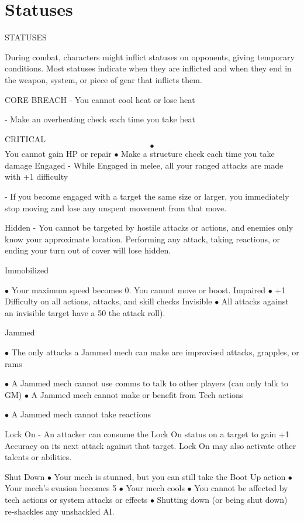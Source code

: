 \chapter{Statuses}

  STATUSES

During combat, characters might inflict statuses on opponents, giving temporary conditions. Most
statuses indicate when they are inflicted and when they end in the weapon, system, or piece of
gear that inflicts them.

CORE BREACH
    -   You cannot cool heat or lose heat

    -   Make an overheating check each time you take heat

CRITICAL
    $$\bullet$$   You cannot gain HP or repair
    $\bullet$    Make a structure check each time you take damage
Engaged
    -   While Engaged in melee, all your ranged attacks are made with +1 difficulty

    -   If you become engaged with a target the same size or larger, you immediately stop
        moving and lose any unspent movement from that move.

Hidden
    -   You cannot be targeted by hostile attacks or actions, and enemies only know your
        approximate location. Performing any attack, taking reactions, or ending your turn out of
        cover will lose hidden.

Immobilized

    $\bullet$    Your maximum speed becomes 0. You cannot move or boost.
Impaired
    $\bullet$    +1 Difficulty on all actions, attacks, and skill checks
Invisible
    $\bullet$    All attacks against an invisible target have a 50%
        the attack roll).

Jammed

    $\bullet$    The only attacks a Jammed mech can make are improvised attacks, grapples, or rams

    $\bullet$    A Jammed mech cannot use comms to talk to other players (can only talk to GM)
    $\bullet$    A Jammed mech cannot make or benefit from Tech actions

    $\bullet$    A Jammed mech cannot take reactions

Lock On
    -   An attacker can consume the Lock On status on a target to gain +1 Accuracy on its next
        attack against that target. Lock On may also activate other talents or abilities.

Shut Down
    $\bullet$    Your mech is stunned, but you can still take the Boot Up action
    $\bullet$    Your mech’s evasion becomes 5
    $\bullet$    Your mech cools
    $\bullet$    You cannot be affected by tech actions or system attacks or effects
    $\bullet$    Shutting down (or being shut down) re-shackles any unshackled AI.

